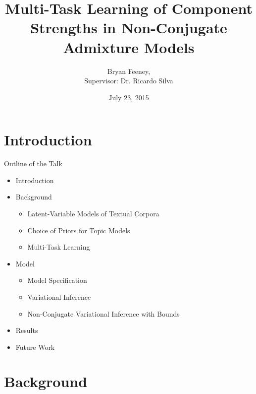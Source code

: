 \documentclass[xcolor=dvipsnames]{beamer}
\author{Bryan Feeney, \\
Supervisor: Dr. Ricardo Silva}
\title[Multitask Admixture Prediction]{Multi-Task Learning of Component Strengths in Non-Conjugate Admixture Models}
\institute[University College London]{
 University College London
}
\date[July 23, 2015]{July 23, 2015}
\begin{document}


\begin{frame}[plain]
  \titlepage
\end{frame}






\section{Introduction}
\begin{frame}{Outline of the Talk}

\begin{itemize}
    \item<1-> Introduction
    \item<2-> Background
     {
        \begin{itemize}
            \item Latent-Variable Models of Textual Corpora
            \item Choice of Priors for Topic Models
            \item Multi-Task Learning
        \end{itemize}
    }
    \item<3-> Model
     {
        \begin{itemize}
            \item Model Specification
            \item Variational Inference
            \item Non-Conjugate Variational Inference with Bounds
        \end{itemize}
    }
    \item<4-> Results
    \item<5->Future Work
\end{itemize}


\end{frame}


\section{Background}
\end{document}
